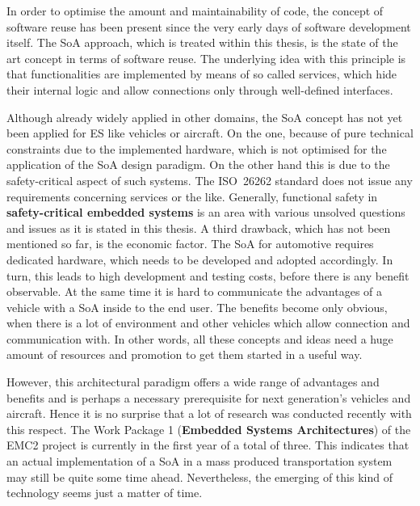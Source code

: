 In order to optimise the amount and maintainability of code, the concept of software reuse has been present since the very early days of software development itself. The SoA approach, which is treated within this thesis, is the state of the art concept in terms of software reuse. The underlying idea with this principle is that functionalities are implemented by means of so called services, which hide their internal logic and allow connections only through well-defined interfaces.

Although already widely applied in other domains, the SoA concept has not yet been applied for ES like vehicles or aircraft. On the one, because of pure technical constraints due to the implemented hardware, which is not optimised for the application of the SoA design paradigm. On the other hand this is due to the safety-critical aspect of such systems. The \mbox{ISO 26262} standard does not issue any requirements concerning services or the like. Generally, functional safety in \textbf{safety-critical embedded systems} is an area with various unsolved questions and issues as it is stated in this thesis. A third drawback, which has not been mentioned so far, is the economic factor. The SoA for automotive requires dedicated hardware, which needs to be developed and adopted accordingly. In turn, this leads to high development and testing costs, before there is any benefit observable. At the same time it is hard to communicate the advantages of a vehicle with a SoA inside to the end user. The benefits become only obvious, when there is a lot of environment and other vehicles which allow connection and communication with. In other words, all these concepts and ideas need a huge amount of resources and promotion to get them started in a useful way.

However, this architectural paradigm offers a wide range of advantages and benefits and is perhaps a necessary prerequisite for next generation's vehicles and aircraft. Hence it is no surprise that a lot of research was conducted recently with this respect. The Work Package 1 (\textbf{Embedded Systems Architectures}) of the EMC2 project is currently in the first year of a total of three. This indicates that an actual implementation of a SoA in a mass produced transportation system may still be quite some time ahead. Nevertheless, the emerging of this kind of technology seems just a matter of time.